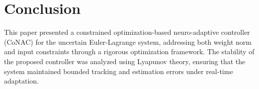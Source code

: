 \documentclass[lettersize,journal]{IEEEtran}
\begin{document}

\section{Conclusion}\label{sec:conclusion}

This paper presented a constrained optimization-based neuro-adaptive controller (CoNAC) for the uncertain Euler-Lagrange system, addressing both weight norm and input constraints through a rigorous optimization framework. The stability of the proposed controller was analyzed using Lyapunov theory, ensuring that the system maintained bounded tracking and estimation errors under real-time adaptation.
\end{document}
